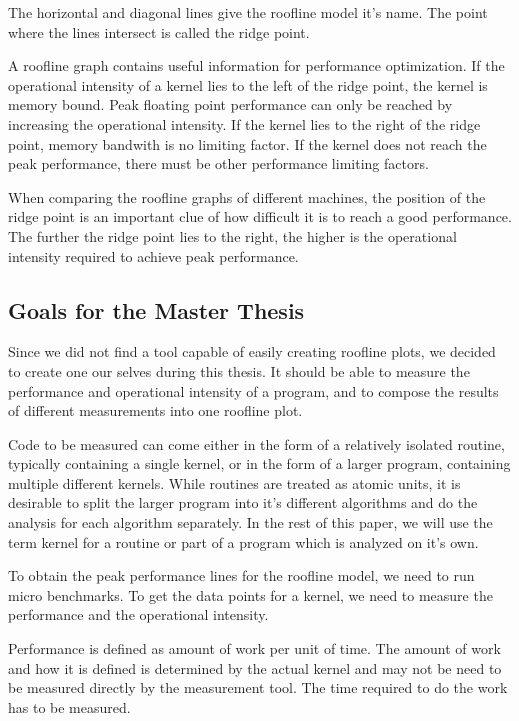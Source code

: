 \documentclass[a4paper,12pt]{article}
\begin{document}
The horizontal and diagonal lines give the roofline model it's name. The point
where the lines intersect is called the ridge point. 

A roofline graph contains useful information for performance optimization. If
the operational intensity of a kernel lies to the left of the ridge point, the
kernel is memory bound. Peak floating point performance can only be reached by
increasing the operational intensity. If the kernel lies to the right of the
ridge point, memory bandwith is no limiting factor. If the kernel does not reach
the peak performance, there must be other performance limiting factors.

When comparing the roofline graphs of different machines, the position of the
ridge point is an important clue of how difficult it is to reach a good
performance. The further the ridge point lies to the right, the higher is the
operational intensity required to achieve peak performance. 

\subsection{Goals for the Master Thesis}
Since we did not find a tool capable of easily creating roofline plots, we
decided to create one our selves during this thesis. It should be able to
measure the performance and operational intensity of a program, and to compose
the results of different measurements into one roofline plot.
  
Code to be measured can come either in the form of a relatively isolated
routine, typically containing a single kernel, or in the form of a larger
program, containing multiple different kernels. While routines are treated as
atomic units, it is desirable to split the larger program into it's different
algorithms and do the analysis for each algorithm separately. In the rest of
this paper, we will use the term kernel for a routine or part of a program which
is analyzed on it's own.

To obtain the peak performance lines for the roofline model, we need to run
micro benchmarks. To get the data points for a kernel, we need to measure the
performance and the operational intensity. 

Performance is defined as amount of work per unit of time. The amount of work
and how it is defined is determined by the actual kernel and may not be need to
be measured directly by the measurement tool. The time required to do the work
has to be measured.
\end{document}
